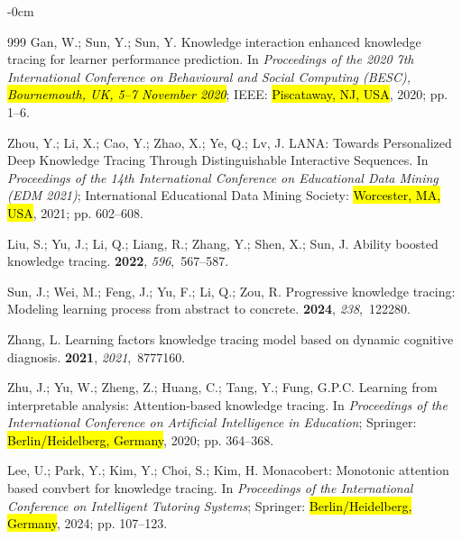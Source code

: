 \documentclass[applsci,article,accept,moreauthors,pdftex]{Definitions/mdpi}
\begin{document}
\begin{adjustwidth}{-\extralength}{0cm}
\begin{thebibliography}{999}
Gan, W.; Sun, Y.; Sun, Y.
\newblock Knowledge interaction enhanced knowledge tracing for learner
  performance prediction.
\newblock In \textit{Proceedings of the 2020 7th International Conference on
  Behavioural and Social Computing (BESC), \hl{Bournemouth, UK, 5--7 November 2020}}; IEEE: \hl{Piscataway, NJ, USA},  2020; pp. 1--6.

Zhou, Y.; Li, X.; Cao, Y.; Zhao, X.; Ye, Q.; Lv, J.
\newblock LANA: Towards Personalized Deep Knowledge Tracing Through
  Distinguishable Interactive Sequences.
\newblock In \textit{Proceedings of the 14th International
  Conference on Educational Data Mining (EDM 2021)}; International Educational
  Data Mining Society: \hl{Worcester, MA, USA},  2021; pp. 602--608.


Liu, S.; Yu, J.; Li, Q.; Liang, R.; Zhang, Y.; Shen, X.; Sun, J.
\newblock Ability boosted knowledge tracing.
 {\bf 2022}, {\em 596},~567--587.

Sun, J.; Wei, M.; Feng, J.; Yu, F.; Li, Q.; Zou, R.
\newblock Progressive knowledge tracing: Modeling learning process from
  abstract to concrete.
 {\bf 2024}, {\em 238},~122280.

Zhang, L.
\newblock Learning factors knowledge tracing model based on dynamic cognitive
  diagnosis.
 {\bf 2021}, {\em
  2021},~8777160.

Zhu, J.; Yu, W.; Zheng, Z.; Huang, C.; Tang, Y.; Fung, G.P.C.
\newblock Learning from interpretable analysis: Attention-based knowledge
  tracing.
\newblock In \textit{Proceedings of the International Conference on Artificial
  Intelligence in Education}; Springer: \hl{Berlin/Heidelberg, Germany},  2020; pp. 364--368.

Lee, U.; Park, Y.; Kim, Y.; Choi, S.; Kim, H.
\newblock Monacobert: Monotonic attention based convbert for knowledge tracing.
\newblock In \textit{Proceedings of the International Conference on Intelligent
  Tutoring Systems}; Springer: \hl{Berlin/Heidelberg, Germany},  2024; pp. 107--123.


\end{thebibliography}
\end{adjustwidth}
\end{document}
